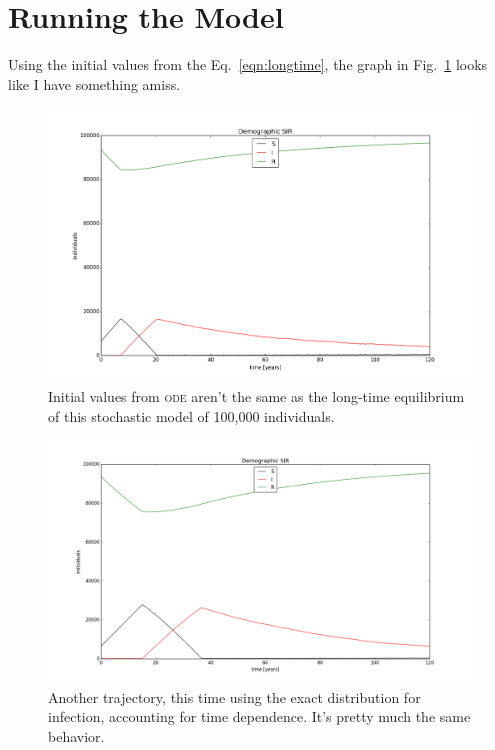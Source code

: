\documentclass{article}
\begin{document}




\section{Running the Model}
Using the initial values from the Eq.~\ref{eqn:longtime}, the graph
in Fig.~\ref{fig:longbehavior} looks like I have something amiss.
\begin{figure}
\centerline{\includegraphics[scale=0.7]{longbehavior}}
\caption{Initial values from \textsc{ode} aren't the same as the long-time
equilibrium of this stochastic model of 100,000 individuals.\label{fig:longbehavior}}
\end{figure}

\begin{figure}
\centerline{\includegraphics[scale=0.6]{longexact}}
\caption{Another trajectory, this time using the exact distribution
for infection, accounting for time dependence. It's pretty much
the same behavior.\label{fig:longexact}}
\end{figure}




\end{document}
